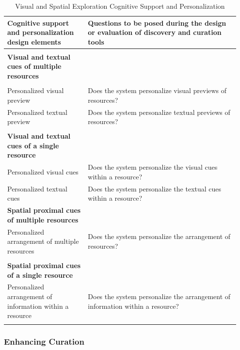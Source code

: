 \documentclass{sigchi}
\begin{document}
{{\begin{table}[ht!]
\caption{Visual and Spatial Exploration Cognitive Support and Personalization}
\label{table:exploration_support}
\begin{tabular}{| p{0.33\linewidth}|p{0.62\linewidth}|}
\hline
Cognitive support and personalization design elements & Questions to be posed during the design or evaluation of discovery and curation tools  \\
\hline
 &\\
\textbf{Visual and textual cues of multiple resources} & \\
&\\
Personalized visual preview  & Does the system personalize visual previews of resources? \\
Personalized textual preview & Does the system personalize textual previews of resources? \\
& \\
\textbf{Visual and textual cues of a single resource} & \\
Personalized visual cues                 & Does the system personalize the visual cues within a resource? \\
Personalized textual cues                & Does the system personalize the textual cues within a resource? \\
\textbf{Spatial proximal cues of multiple resources} & \\
Personalized arrangement of multiple resources & Does the system personalize the arrangement of resources? \\  
& \\                                                  
\textbf{Spatial proximal cues of a single resource} & \\
Personalized arrangement of information within a resource          & Does the system personalize the arrangement of information within a resource? \\                                                       
& \\
\hline
\end{tabular}
\end{table}
} %

{\subsubsection{Enhancing Curation}

}}
\end{document}
